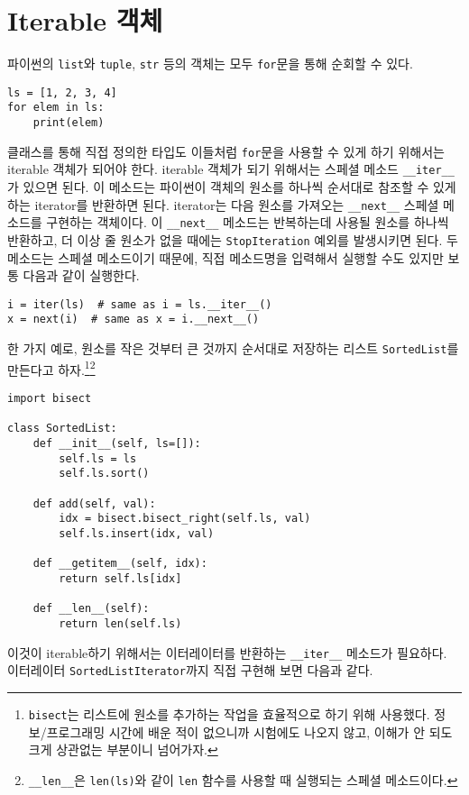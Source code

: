 \documentclass{scrartcl}
\begin{document}
\section{Iterable 객체}
파이썬의 \texttt{list}와 \texttt{tuple}, \texttt{str} 등의 객체는 모두 \texttt{for}문을 통해 순회할 수 있다.
\begin{lstlisting}
ls = [1, 2, 3, 4]
for elem in ls:
    print(elem)
\end{lstlisting}
클래스를 통해 직접 정의한 타입도 이들처럼 \texttt{for}문을 사용할 수 있게 하기 위해서는 iterable 객체가 되어야 한다. iterable 객체가 되기 위해서는 스페셜 메소드 \texttt{\_\_iter\_\_}가 있으면 된다. 이 메소드는 파이썬이 객체의 원소를 하나씩 순서대로 참조할 수 있게 하는 iterator를 반환하면 된다. iterator는 다음 원소를 가져오는 \texttt{\_\_next\_\_} 스페셜 메소드를 구현하는 객체이다. 이 \texttt{\_\_next\_\_} 메소드는 반복하는데 사용될 원소를 하나씩 반환하고, 더 이상 줄 원소가 없을 때에는 \texttt{StopIteration} 예외를 발생시키면 된다. 두 메소드는 스페셜 메소드이기 때문에, 직접 메소드명을 입력해서 실행할 수도 있지만 보통 다음과 같이 실행한다.
\begin{lstlisting}
i = iter(ls)  # same as i = ls.__iter__()
x = next(i)  # same as x = i.__next__()
\end{lstlisting}
한 가지 예로, 원소를 작은 것부터 큰 것까지 순서대로 저장하는 리스트 \texttt{SortedList}를 만든다고 하자.\footnote{\texttt{bisect}는 리스트에 원소를 추가하는 작업을 효율적으로 하기 위해 사용했다. 정보/프로그래밍 시간에 배운 적이 없으니까 시험에도 나오지 않고, 이해가 안 되도 크게 상관없는 부분이니 넘어가자.}\footnote{\texttt{\_\_len\_\_}은 \texttt{len(ls)}와 같이 \texttt{len} 함수를 사용할 때 실행되는 스페셜 메소드이다.}
\begin{lstlisting}
import bisect

class SortedList:
    def __init__(self, ls=[]):
        self.ls = ls
        self.ls.sort()

    def add(self, val):
        idx = bisect.bisect_right(self.ls, val)
        self.ls.insert(idx, val)

    def __getitem__(self, idx):
        return self.ls[idx]
    
    def __len__(self):
        return len(self.ls)
\end{lstlisting}
이것이 iterable하기 위해서는 이터레이터를 반환하는 \texttt{\_\_iter\_\_} 메소드가 필요하다. 이터레이터 \texttt{SortedListIterator}까지 직접 구현해 보면 다음과 같다.
\end{document}
